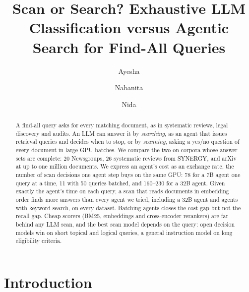 \documentclass[sigconf,nonacm]{acmart}
\begin{document}
\title{Scan or Search? Exhaustive LLM Classification versus Agentic Search for Find-All Queries}

\author{Ayesha}
\author{Nabanita}
\author{Nida}

\begin{abstract}
A find-all query asks for every matching document, as in systematic reviews,
legal discovery and audits. An LLM can answer it by \emph{searching}, as an
agent that issues retrieval queries and decides when to stop, or by
\emph{scanning}, asking a yes/no question of every document in large GPU
batches. We compare the two on corpora whose answer sets are complete:
20 Newsgroups, 26 systematic reviews from SYNERGY, and arXiv at up to one
million documents. We express an agent's cost as an exchange rate, the number
of scan decisions one agent step buys on the same GPU: 78 for a 7B agent one
query at a time, 11 with 50 queries batched, and 160--230 for a 32B agent.
Given exactly the agent's time on each query, a scan that reads documents in
embedding order finds more answers than every agent we tried, including a 32B
agent and agents with keyword search, on every dataset. Batching agents closes
the cost gap but not the recall gap. Cheap scorers (BM25, embeddings and
cross-encoder rerankers) are far behind any LLM scan, and the best scan model
depends on the query: open decision models win on short topical and logical
queries, a general instruction model on long eligibility criteria.
\end{abstract}

\maketitle

\section{Introduction}
\end{document}
